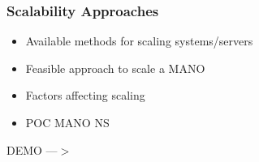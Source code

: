 \begin{frame}
\frametitle{Scalability Approaches}
\begin{itemize}
	\item Available methods for scaling systems/servers
	\item Feasible approach to scale a MANO
	\item Factors affecting scaling
	\item POC MANO NS
\end{itemize}

\Huge{\centerline{DEMO ---$ > $}}
\end{frame}